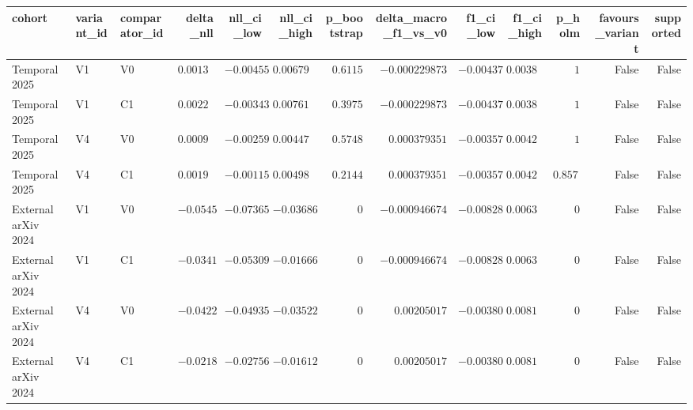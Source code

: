 \begin{tabular}{lllrrrrrrrrrr}
\toprule
cohort & variant\_id & comparator\_id & delta\_nll & nll\_ci\_low & nll\_ci\_high & p\_bootstrap & delta\_macro\_f1\_vs\_v0 & f1\_ci\_low & f1\_ci\_high & p\_holm & favours\_variant & supported \\
\midrule
Temporal 2025 & V1 & V0 & $0.00135259$ & $-0.00455836$ & $0.00679454$ & $0.6115$ & $-0.000229873$ & $-0.00437318$ & $0.00385127$ & $1$ & False & False \\
Temporal 2025 & V1 & C1 & $0.00229356$ & $-0.00343495$ & $0.0076132$ & $0.3975$ & $-0.000229873$ & $-0.00437318$ & $0.00385127$ & $1$ & False & False \\
Temporal 2025 & V4 & V0 & $0.000983667$ & $-0.00259742$ & $0.00447582$ & $0.5748$ & $0.000379351$ & $-0.00357007$ & $0.00429286$ & $1$ & False & False \\
Temporal 2025 & V4 & C1 & $0.00192463$ & $-0.00115952$ & $0.00498225$ & $0.2144$ & $0.000379351$ & $-0.00357007$ & $0.00429286$ & $0.8576$ & False & False \\
External arXiv 2024 & V1 & V0 & $-0.0545747$ & $-0.0736502$ & $-0.0368638$ & $0$ & $-0.000946674$ & $-0.00828514$ & $0.00634002$ & $0$ & False & False \\
External arXiv 2024 & V1 & C1 & $-0.0341675$ & $-0.0530906$ & $-0.016669$ & $0$ & $-0.000946674$ & $-0.00828514$ & $0.00634002$ & $0$ & False & False \\
External arXiv 2024 & V4 & V0 & $-0.0422194$ & $-0.0493565$ & $-0.0352207$ & $0$ & $0.00205017$ & $-0.00380322$ & $0.00812211$ & $0$ & False & False \\
External arXiv 2024 & V4 & C1 & $-0.0218123$ & $-0.0275685$ & $-0.0161246$ & $0$ & $0.00205017$ & $-0.00380322$ & $0.00812211$ & $0$ & False & False \\
\bottomrule
\end{tabular}
